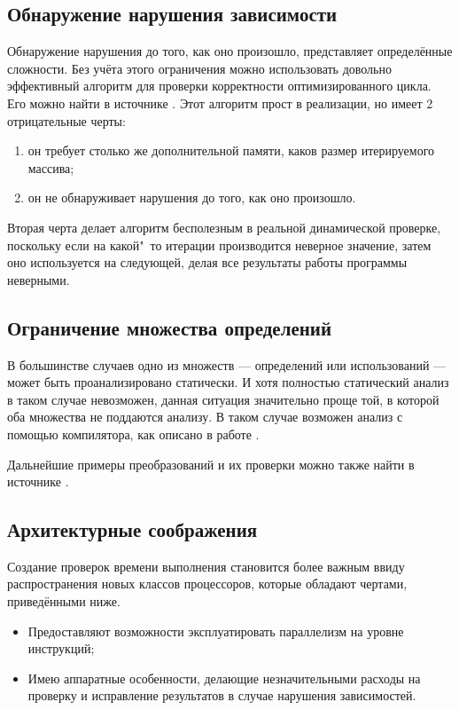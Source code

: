 \subsection{Обнаружение нарушения зависимости}

Обнаружение нарушения до того, как оно произошло, представляет определённые сложности. Без учёта этого ограничения можно использовать довольно эффективный алгоритм для проверки корректности оптимизированного цикла. Его можно найти в источнике \cite{ZuckPFGH02}. Этот алгоритм прост в реализации, но имеет 2 отрицательные черты:

\begin{enumerate}
	\item он требует столько же дополнительной памяти, каков размер итерируемого массива;
	\item он не обнаруживает нарушения до того, как оно произошло.
\end{enumerate}

Вторая черта делает алгоритм бесполезным в реальной динамической проверке, поскольку если на какой"~то итерации производится неверное значение, затем оно используется на следующей, делая все результаты работы программы неверными.

\subsection{Ограничение множества определений}

В большинстве случаев одно из множеств --- определений или использований --- может быть проанализировано статически. И хотя полностью статический анализ в таком случае невозможен, данная ситуация значительно проще той, в которой оба множества не поддаются анализу. В таком случае возможен анализ с помощью компилятора, как описано в работе \cite{ZuckPFGH02}.

Дальнейшие примеры преобразований и их проверки можно также найти в источнике \cite{ZuckPFGH02}.

\subsection{Архитектурные соображения}

Создание проверок времени выполнения становится более важным ввиду распространения новых классов процессоров, которые обладают чертами, приведёнными ниже.

\begin{itemize}
	\item Предоставляют возможности эксплуатировать параллелизм на уровне инструкций;
	\item Имею аппаратные особенности, делающие незначительными расходы на проверку и исправление результатов в случае нарушения зависимостей.
\end{itemize}

